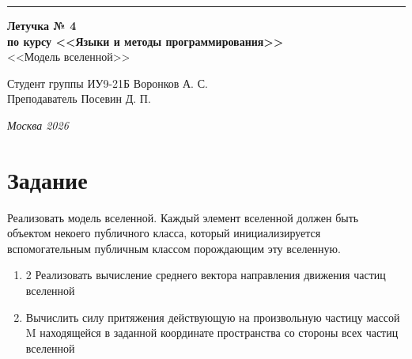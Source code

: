 \documentclass[a4paper, 14pt]{extarticle}
\begin{document}
\begin{titlepage}
\vspace*{-16pt}
\hspace{30pt}\rule{0.866\textwidth}{0.4pt}
  
\vspace{11em}

\begin{center}
\Large {\bf Летучка № 4} \\ 
\large {\bf по курсу <<Языки и методы программирования>>} \\ 
\large <<Модель вселенной>>
\end{center}\normalsize

\vspace{8em}


\begin{flushright}
  {Студент группы ИУ9-21Б Воронков А. С.\hspace*{15pt} \\
  \vspace{2ex}
  Преподаватель Посевин Д. П.\hspace*{15pt}}
\end{flushright}

\bigskip

\vfill
 

\begin{center}
\textsl{Москва 2026}
\end{center}
\end{titlepage}

\renewcommand{\ttdefault}{pcr}

\setlength{\tabcolsep}{3pt}
\newpage
\setcounter{page}{2}

\section{Задание}
Реализовать модель вселенной. Каждый элемент вселенной должен быть объектом некоего публичного класса, который инициализируется вспомогательным публичным классом порождающим эту вселенную.
\begin{enumerate}
    \item 2	Реализовать вычисление среднего вектора направления движения частиц вселенной
    \item Вычислить силу притяжения действующую на произвольную частицу массой M находящейся в заданной координате пространства со стороны всех частиц вселенной
\end{enumerate}
\end{document}
